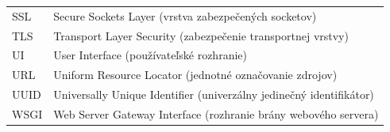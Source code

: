 \begin{tabular}{p{2.8cm} p{11.5cm}}
  SSL    & Secure Sockets Layer (vrstva zabezpečených socketov) \\[3pt]
  TLS    & Transport Layer Security (zabezpečenie transportnej vrstvy) \\[3pt]
  UI     & User Interface (používateľské rozhranie) \\[3pt]
  URL    & Uniform Resource Locator (jednotné označovanie zdrojov) \\[3pt]
  UUID   & Universally Unique Identifier (univerzálny jedinečný identifikátor) \\[3pt]
  WSGI   & Web Server Gateway Interface (rozhranie brány webového servera) \\[3pt]
\end{tabular}
